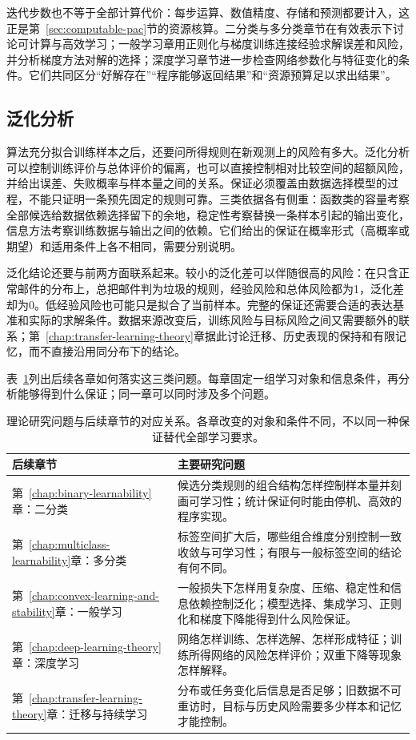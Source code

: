 迭代步数也不等于全部计算代价：每步运算、数值精度、存储和预测都要计入，这正是第~\ref{sec:computable-pac}节的资源核算。二分类与多分类章节在有效表示下讨论可计算与高效学习；一般学习章用正则化与梯度训练连接经验求解误差和风险，并分析梯度方法对解的选择；深度学习章节进一步检查网络参数化与特征变化的条件。它们共同区分“好解存在”“程序能够返回结果”和“资源预算足以求出结果”。

\subsection{泛化分析}
\label{sec:research-generalization}

算法充分拟合训练样本之后，还要问所得规则在新观测上的风险有多大。泛化分析可以控制训练评价与总体评价的偏离，也可以直接控制相对比较空间的超额风险，并给出误差、失败概率与样本量之间的关系。保证必须覆盖由数据选择模型的过程，不能只证明一条预先固定的规则可靠。三类依据各有侧重：函数类的容量考察全部候选给数据依赖选择留下的余地，稳定性考察替换一条样本引起的输出变化，信息方法考察训练数据与输出之间的依赖。它们给出的保证在概率形式（高概率或期望）和适用条件上各不相同，需要分别说明。

泛化结论还要与前两方面联系起来。较小的泛化差可以伴随很高的风险：在只含正常邮件的分布上，总把邮件判为垃圾的规则，经验风险和总体风险都为1，泛化差却为0。低经验风险也可能只是拟合了当前样本。完整的保证还需要合适的表达基准和实际的求解条件。数据来源改变后，训练风险与目标风险之间又需要额外的联系；第~\ref{chap:transfer-learning-theory}章据此讨论迁移、历史表现的保持和有限记忆，而不直接沿用同分布下的结论。

表~\ref{tab:learning-theory-chapter-questions}列出后续各章如何落实这三类问题。每章固定一组学习对象和信息条件，再分析能够得到什么保证；同一章可以同时涉及多个问题。

\begin{table}[htbp]
  \centering
  \small
  \begin{tabularx}{\linewidth}{@{}lX@{}}
    \toprule
    \textbf{后续章节} & \textbf{主要研究问题} \\
    \midrule
    第~\ref{chap:binary-learnability}章：二分类 & 候选分类规则的组合结构怎样控制样本量并刻画可学习性；统计保证何时能由停机、高效的程序实现。 \\
    第~\ref{chap:multiclass-learnability}章：多分类 & 标签空间扩大后，哪些组合维度分别控制一致收敛与可学习性；有限与一般标签空间的结论有何不同。 \\
    第~\ref{chap:convex-learning-and-stability}章：一般学习 & 一般损失下怎样用复杂度、压缩、稳定性和信息依赖控制泛化；模型选择、集成学习、正则化和梯度下降能得到什么风险保证。 \\
    第~\ref{chap:deep-learning-theory}章：深度学习 & 网络怎样训练、怎样选解、怎样形成特征；训练所得网络的风险怎样评价；双重下降等现象怎样解释。 \\
    第~\ref{chap:transfer-learning-theory}章：迁移与持续学习 & 分布或任务变化后信息是否足够；旧数据不可重访时，目标与历史风险需要多少样本和记忆才能控制。 \\
    \bottomrule
  \end{tabularx}
  \caption{理论研究问题与后续章节的对应关系。各章改变的对象和条件不同，不以同一种保证替代全部学习要求。}
  \label{tab:learning-theory-chapter-questions}
\end{table}


